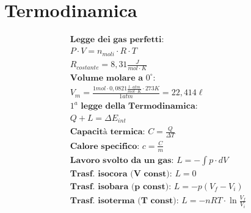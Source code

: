 \section{Termodinamica}

\begin{gather*}
    \textbf{Legge dei gas perfetti:} \\
    P \cdot V = n_{moli} \cdot R \cdot T \\
    R_{costante} = 8,31 \frac{J}{mol \cdot K} \\
    \textbf{Volume molare a $0^\circ$: } \\
    V_m = \frac{1 \textit{mol} \cdot 0,0821 \frac{l \cdot atm}{mol \cdot K} \cdot 273 K}{1 \textit{atm}} =  22,414 \ell \\
    \textbf{$1^a$ legge della Termodinamica:} \\
    Q + L = \Delta E_{int}  \\
    \textbf{Capacità termica: } C = \frac{Q}{\Delta T} \\
    \textbf{Calore specifico: } c = \frac{C}{m} \\
    \textbf{Lavoro svolto da un gas: } L = - \int p \cdot dV \\
    \textbf{Trasf. isocora (V const): } L = 0 \\
    \textbf{Trasf. isobara (p const): } L = -p(V_f - V_i)    \\
    \textbf{Trasf. isoterma (T const): } L = -nRT \cdot \ln \frac{V_f}{V_i}
\end{gather*}
